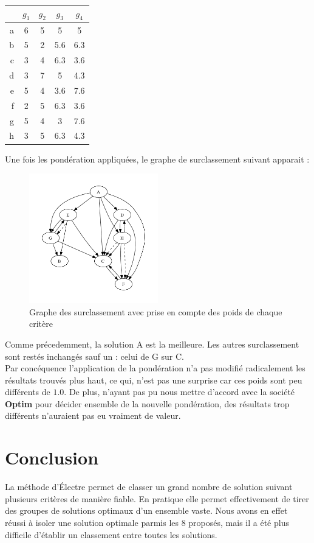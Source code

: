 \begin{center}
	\begin{tabular}{r | c c c c}
		~ & $g_1$ & $g_2$ & $g_3$ & $g_4$ \\ \hline
		a & 6 & 5 & 5   & 5   \\
		b & 5 & 2 & 5.6 & 6.3 \\
		c & 3 & 4 & 6.3 & 3.6 \\
		d & 3 & 7 & 5   & 4.3 \\
		e & 5 & 4 & 3.6 & 7.6 \\
		f & 2 & 5 & 6.3 & 3.6 \\
		g & 5 & 4 & 3   & 7.6 \\
		h & 3 & 5 & 6.3 & 4.3 \\
	\end{tabular}
\end{center}

\clearpage

Une fois les pondération appliquées, le graphe de surclassement suivant apparait :
\begin{figure}[!h]
\begin{center}
\includegraphics[width=0.5\textwidth]{../SourcesMatlab/electre3-2.pdf}
\caption{Graphe des surclassement avec prise en compte des poids de chaque critère}
\end{center}
\end{figure}

Comme précedemment, la solution A est la meilleure. Les autres surclassement sont restés inchangés sauf un : celui de G sur C.\\
Par concéquence l'application de la pondération n'a pas modifié radicalement les résultats trouvés plus haut, ce qui, n'est pas une surprise car ces poids 
sont peu différents de $1.0$. De plus, n'ayant pas pu nous mettre d'accord avec la société \textbf{Optim} pour décider ensemble de la nouvelle pondération,
des résultats trop différents n'auraient pas eu vraiment de valeur.

\section{Conclusion}

La méthode d'Électre  permet de classer un grand nombre de solution suivant plusieurs critères de manière fiable. En pratique elle permet effectivement de tirer des groupes de solutions optimaux d'un ensemble vaste.
Nous avons en effet réussi à isoler une solution optimale parmis les 8 proposés, mais il a été plus difficile d'établir un classement entre toutes les solutions.\\


